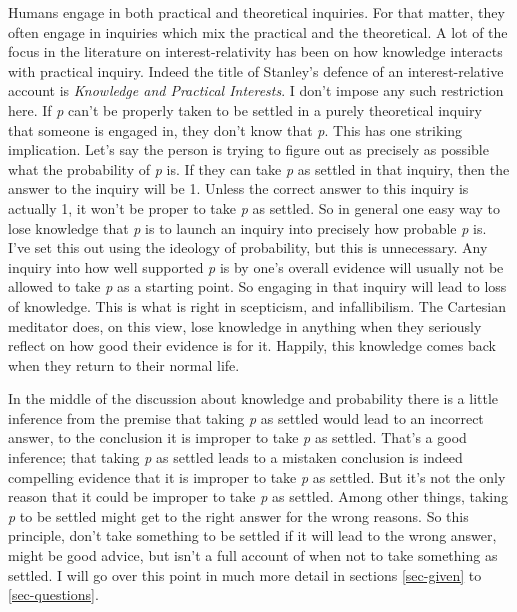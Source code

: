 \documentclass[
  10pt,
  letterpaper,
  twoside]{scrbook}
\begin{document}
Humans engage in both practical and theoretical inquiries. For that
matter, they often engage in inquiries which mix the practical and the
theoretical. A lot of the focus in the literature on interest-relativity
has been on how knowledge interacts with practical inquiry. Indeed the
title of Stanley's defence of an interest-relative account is
\emph{Knowledge and Practical Interests}. I don't impose any such
restriction here. If \emph{p} can't be properly taken to be settled in a
purely theoretical inquiry that someone is engaged in, they don't know
that \emph{p}. This has one striking implication. Let's say the person
is trying to figure out as precisely as possible what the probability of
\emph{p} is. If they can take \emph{p} as settled in that inquiry, then
the answer to the inquiry will be 1. Unless the correct answer to this
inquiry is actually 1, it won't be proper to take \emph{p} as settled.
So in general one easy way to lose knowledge that \emph{p} is to launch
an inquiry into precisely how probable \emph{p} is. I've set this out
using the ideology of probability, but this is unnecessary. Any inquiry
into how well supported \emph{p} is by one's overall evidence will
usually not be allowed to take \emph{p} as a starting point. So engaging
in that inquiry will lead to loss of knowledge. This is what is right in
scepticism, and infallibilism. The Cartesian meditator does, on this
view, lose knowledge in anything when they seriously reflect on how good
their evidence is for it. Happily, this knowledge comes back when they
return to their normal life.

In the middle of the discussion about knowledge and probability there is
a little inference from the premise that taking \emph{p} as settled
would lead to an incorrect answer, to the conclusion it is improper to
take \emph{p} as settled. That's a good inference; that taking \emph{p}
as settled leads to a mistaken conclusion is indeed compelling evidence
that it is improper to take \emph{p} as settled. But it's not the only
reason that it could be improper to take \emph{p} as settled. Among
other things, taking \emph{p} to be settled might get to the right
answer for the wrong reasons. So this principle, don't take something to
be settled if it will lead to the wrong answer, might be good advice,
but isn't a full account of when not to take something as settled. I
will go over this point in much more detail in sections \ref{sec-given}
to \ref{sec-questions}.
\end{document}
